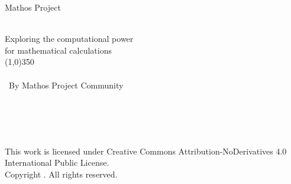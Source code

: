 \documentclass[11pt,a4paper]{report}
\begin{document}
\begin{titlepage}
\begin{center}
{\large Mathos Project}
\\\

{\huge Exploring the computational power\\ for mathematical calculations}\\
\line(1,0){350}
\\\
\\\
{\small By Mathos Project Community} \\\
\\\
\\\
\\\
\resizebox{\linewidth}{!}{\itshape $\Pi$} %
\end{center}
\vfill
This work is licensed under Creative Commons Attribution-NoDerivatives 4.0 International Public License.\\
Copyright . All rights reserved.
\end{titlepage}



\setcounter{part}{-1}
\setcounter{chapter}{0}
\setcounter{section}{1}
\tableofcontents
\listoftables


\end{document}
